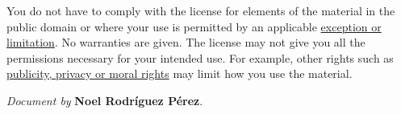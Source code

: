 \noindent You do not have to comply with the license for elements of the material in the public domain or where your use is permitted by an applicable \href{https://creativecommons.org/licenses/by-sa/4.0/deed.en#ref-exception-or-limitation}{exception or limitation}.
No warranties are given. The license may not give you all the permissions necessary for your intended use. For example, other rights such as \href{https://creativecommons.org/licenses/by-sa/4.0/deed.en#ref-publicity-privacy-or-moral-rights}{publicity, privacy or moral rights} may limit how you use the material.

\begin{flushright}
		\vspace{3.0 cm}
		\emph{Document by} \textbf{Noel Rodríguez Pérez}.
\end{flushright}
